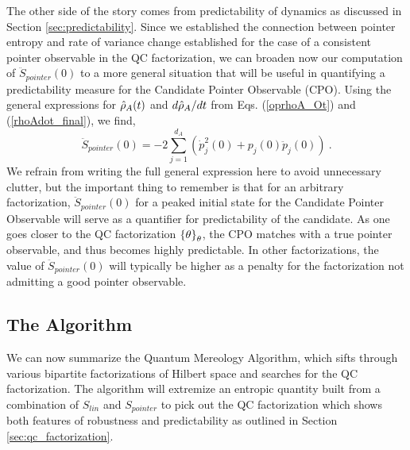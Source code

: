 \documentclass[aps,pra,onecolumn,nofootinbib,11pt,tightenlines]{revtex4-1}
\begin{document}
{The other side of the story comes from predictability of dynamics as discussed in Section \ref{sec:predictability}. Since we established the connection between pointer entropy and rate of variance change established for the case of a consistent pointer observable in the QC factorization, we can broaden now our computation of $\ddot{S}_{pointer}(0)$ to a more general situation that will be useful in quantifying a predictability measure for the Candidate Pointer Observable (CPO).
Using the general expressions for $\hat{\rho}_{A}(t)$ and $d\hat{\rho}_{A}/dt$ from Eqs. (\ref{oprhoA_Ot}) and (\ref{rhoAdot_final}), we find,
\begin{equation}
\label{Spointerdoubledot_general}
\ddot{S}_{pointer}(0) = -2\sum_{j=1}^{d_{A}}\left(\dot{p}^{2}_{j}(0) + p_{j}(0) \ddot{p}_{j}(0)\right) \: .
\end{equation}
We refrain from writing the full general expression here to avoid unnecessary clutter, but the important thing to remember is that for an arbitrary factorization, $\ddot{S}_{pointer}(0)$ for a peaked initial state for the Candidate Pointer Observable will serve as a quantifier for predictability of the candidate. As one goes closer to the QC factorization ${\{\theta\}}_{\theta}$, the CPO matches with a true pointer observable, and thus becomes highly predictable. In other factorizations, the value of $\ddot{S}_{pointer}(0)$ will typically be higher as a penalty for the factorization not admitting a good pointer observable.
}


\subsection{The Algorithm}
\label{subsec:algo}

We can now summarize the Quantum Mereology Algorithm, which sifts through various bipartite factorizations of Hilbert space and searches for the QC factorization. The algorithm will extremize an entropic quantity built from a combination of $S_{lin}$ and $S_{pointer}$ to pick out the QC factorization which shows both features of robustness and predictability as outlined in Section \ref{sec:qc_factorization}. 
\end{document}
